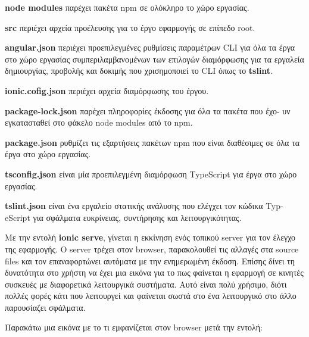 \documentclass[a4paper,12pt]{article}
\begin{document}
					\textbf{node modules} παρέχει πακέτα npm σε ολόκληρο το χώρο εργασίας.
					
					\textbf{src} περιέχει αρχεία προέλευσης για το έργο εφαρμογής σε επίπεδο root.
					
					\textbf{angular.json} περιέχει προεπιλεγμένες ρυθμίσεις παραμέτρων CLI για όλα 
					τα έργα στο χώρο 
					εργασίας συμπεριλαμβανομένων των επιλογών διαμόρφωσης για τα εργαλεία δημιουργίας, προβολής και δοκιμής που χρισημοποιεί
					το CLI όπως το \textbf{tslint}.

					\textbf{ionic.cofig.json} περιέχει αρχεία διαμόρφωσης του έργου.	

					\textbf{package-lock.json} παρέχει πληροφορίες έκδοσης για όλα τα πακέτα που έχο-
					υν εγκατασταθεί στο φάκελο node modules 
					από το npm. 

					\textbf{package.json} ρυθμίζει τις εξαρτήσεις πακέτων npm που είναι διαθέσιμες σε όλα τα έργα στο χώρο εργασίας. 

					\textbf{tsconfig.json} είναι μία προεπιλεγμένη διαμόρφωση TypeScript για έργα στο χώρο εργασίας.

					\textbf{tslint.json} είναι ένα εργαλείο στατικής ανάλυσης που ελέγχει τον κώδικα Typ-
					eScript για σφάλματα ευκρίνειας, συντήρησης και λειτουργικότητας.
					\newpage

					Με την εντολή \textbf{ionic serve}, γίνεται η εκκίνηση ενός τοπικού server για τον έλεγχο της εφαρμογής. Ο server τρέχει στον browser, παρακολουθεί 
					τις αλλαγές στα source files και τον επαναφορτώνει αυτόματα με την ενημερωμένη έκδοση. Επίσης δίνει τη δυνατότητα στο χρήστη να έχει μια εικόνα για το
					πως φαίνεται η εφαρμογή σε κινητές συσκευές με διαφορετικά λειτουργικά συστήματα. Αυτό είναι πολύ χρήσιμο, διότι πολλές φορές κάτι που λειτουργεί και φαίνεται 
					σωστά στο ένα λειτουργικό στο άλλο παρουσίαζει σφάλματα.

					Παρακάτω μια εικόνα με το τι εμφανίζεται στον browser μετά την εντολή:
					\vspace*{1cm}
					
\end{document}

